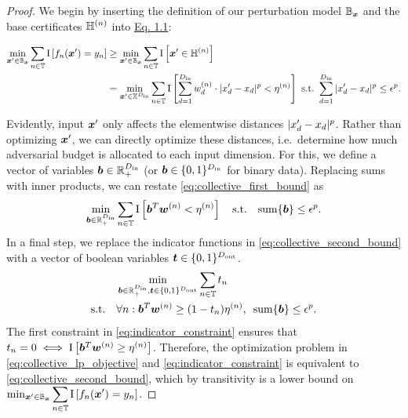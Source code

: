 \begin{proof}
We begin by inserting the definition of our perturbation model ${\mathbb{B}}_{\bm{x}}$ and the base certificates ${\mathbb{H}}^{(n)}$ into \hyperref[eq:recipe]{Eq. 1.1}:

\begin{align}
\min_{\vx' \in \sB_\vx} \sum_{n \in \sT} \mathrm{I}\left[f_n(\vx') = \evy_n \right] 
&\geq
\min_{\vx' \in \sB_\vx} \sum_{n \in \sT} \mathrm{I}\left[\vx' \in \sH^{(n)} \right] \\
\label{eq:collective_first_bound}
&= \min_{\vx' \in \sX^{D_\mathrm{in}}} \sum_{n \in \sT} \mathrm{I}\left[
        \sum_{d=1}^{D_\mathrm{in}}
        \evw_{d}^{(n)} \cdot |\evx_d' -  \evx_d |^p < \eta^{(n)}
    \right]
    \ 
    \text{s.t.}
    \ 
    \sum_{d=1}^{D_\mathrm{in}} |\evx_d' -  \evx_d |^p \leq \epsilon^p.
\end{align}

Evidently, input ${\bm{x}}'$ only affects the elementwise distances $|{x}_d' -  {x}_d |^p$. Rather than optimizing ${\bm{x}}'$, we can directly optimize these distances, i.e.~determine how much adversarial budget is allocated to each input dimension.
For this, we define a vector of variables ${\bm{b}} \in {\mathbb{R}}_+^{D_\mathrm{in}}$ (or ${\bm{b}} \in \{0,1\}^{D_\mathrm{in}}$ for binary data). Replacing sums with inner products, we can restate
\autoref{eq:collective_first_bound} as 
\begin{equation}\label{eq:collective_second_bound}
    \min_{{\bm{b}} \in {\mathbb{R}}_+^{D_\mathrm{in}}} \sum_{n \in {\mathbb{T}}} \mathrm{I}\left[
        {\bm{b}}^T {\bm{w}}^{(n)} < \eta^{(n)}
    \right]
    \quad
    \text{s.t.}
    \quad
    \mathrm{sum}\{{\bm{b}}\} \leq \epsilon^p.
\end{equation}
In a final step, we replace the indicator functions in \autoref{eq:collective_second_bound} with a vector of boolean variables ${\bm{t}} \in \{0,1\}^{D_\mathrm{out}}$.
\begin{align}
    & \min_{{\bm{b}} \in {\mathbb{R}}_+^{D_\mathrm{in}}, {\bm{t}} \in \{0,1\}^{D_\mathrm{out}}} \sum_{n \in {\mathbb{T}}} {t}_n \quad
    \label{eq:collective_lp_objective}
    \\
     \text{s.t.} \quad
        & \forall n: 
        {\bm{b}}^T {\bm{w}}^{(n)} \geq (1 - {t}_n) \eta^{(n)}, \label{eq:indicator_constraint_appendix} \enskip \mathrm{sum}\{{\bm{b}}\} \leq \epsilon^p.
\end{align}
The first constraint in \autoref{eq:indicator_constraint} ensures that
$
    t_n = 0 \iff
    \mathrm{I}\left[
        {\bm{b}}^T {\bm{w}}^{(n)} \geq \eta^{(n)}
    \right]
$.
Therefore, the optimization problem in \autoref{eq:collective_lp_objective} and \autoref{eq:indicator_constraint} is equivalent to \autoref{eq:collective_second_bound}, which by transitivity is a lower bound on 
$\min_{\vx' \in \sB_\vx} \smashoperator{\sum_{n \in \sT}} \mathrm{I}\left[f_n(\vx') = \evy_n \right]$.
\end{proof}

